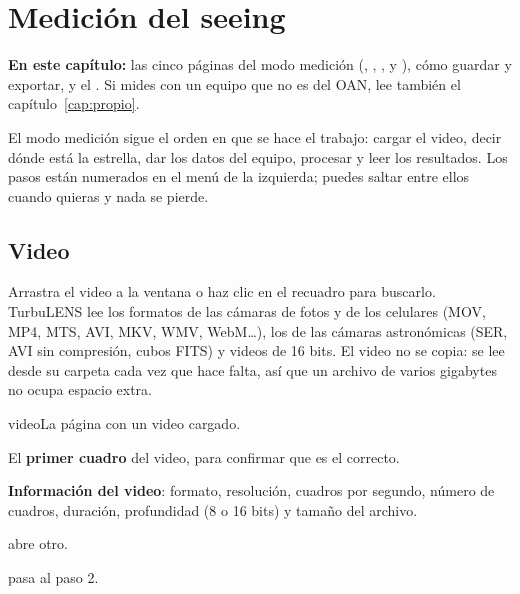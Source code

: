 \chapter{Medición del seeing}\label{cap:medicion}

\begin{resumen}
\textbf{En este capítulo:} las cinco páginas del modo medición (, ,
,  y ), cómo guardar y exportar, y el . Si mides con
un equipo que no es del OAN, lee también el capítulo~\ref{cap:propio}.
\end{resumen}

El modo medición sigue el orden en que se hace el trabajo: cargar el video, decir dónde está la estrella, dar los
datos del equipo, procesar y leer los resultados. Los pasos están numerados en el menú de la izquierda; puedes saltar
entre ellos cuando quieras y nada se pierde.

\section{Video}\label{sec:video}

Arrastra el video a la ventana o haz clic en el recuadro para buscarlo. TurbuLENS lee los formatos de las cámaras de
fotos y de los celulares (MOV, MP4, MTS, AVI, MKV, WMV, WebM\ldots), los de las cámaras astronómicas (SER, AVI sin
compresión, cubos FITS) y videos de 16 bits. El video no se copia: se lee desde su carpeta cada vez que hace falta, así
que un archivo de varios gigabytes no ocupa espacio extra.

\begin{capturam}{video}{La página  con un video cargado.}
\item El \textbf{primer cuadro} del video, para confirmar que es el correcto.
\item \textbf{Información del video}: formato, resolución, cuadros por segundo, número de cuadros, duración,
profundidad (8 o 16 bits) y tamaño del archivo.
\item {} abre otro.
\item {} pasa al paso 2.
\end{capturam}

